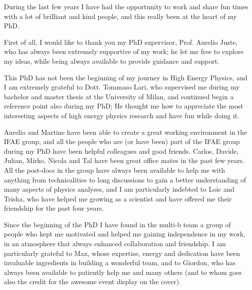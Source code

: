 \par\bigskip  
\par\bigskip

During the last few years I have had the opportunity to work and share fun times with a lot 
of brilliant and kind people, and this really been at the heart of my PhD. 

\par\bigskip 

First of all, I would like to thank you my PhD supervisor, Prof. Aurelio Juste, who has always been 
extremely supportive of my work; 
he let me free to explore my ideas, while being always available to provide guidance and support. 

\par\bigskip 

This PhD has not been the beginning of my journey in High Energy Physics, and I am extremely grateful to 
Dott. Tommaso Lari, who supervised me during my bachelor and master thesis at the University of Milan, 
and continued begin a reference point also during my PhD; 
He thought me how to appreciate the most interesting aspects of high energy physics research 
and have fun while doing it.  

\par\bigskip 
 
Aurelio and Martine have been able to create a great working environment in the IFAE group, and 
all the people who are (or have been) part of the IFAE group during my PhD have been helpful colleagues and 
good friends.  
Carlos, Davide, Julian, Mirko, Nicola and Tal have been great office mates in the past few years.  
All the post-docs in the group have always been available to help me with 
anything from technicalities to long discussions to gain a better understanding of many aspects of physics analyses, 
and I am particularly indebted to Loic and Trisha, who have helped me growing as a scientist and have offered me 
their friendship for the past four years. 

\par\bigskip

Since the beginning of the PhD I have found in the multi-b team a 
group of people who kept me motivated and helped me 
gaining independence in my work, 
in an atmosphere that always enhanced collaboration and friendship.  
I am particularly grateful to Max, whose expertise, energy and dedication have been 
invaluable ingredients in building a wonderful team, 
and to Giordon, who has always been available to patiently help me and many others (and 
to whom goes also the credit for the awesome event display on the cover). 

